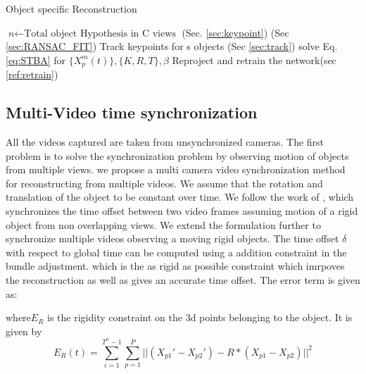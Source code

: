 \documentclass[10pt,twocolumn,letterpaper]{article}
\begin{document}
\begin{algorithm}
\caption{Object specific Reconstruction}\label{euclid}
%
$\textit{n} \gets \text{Total object Hypothesis in C views }$(Sec. \ref{sec:keypoint})\;
(Sec \ref{sec:RANSAC_FIT})
Track keypoints for s objects (Sec \ref{sec:track})\;
solve Eq.\ref{eq:STBA} for $\lbrace X_p^m(t) \rbrace,\lbrace K,R,T \rbrace,\beta$\;
Reproject and retrain the network(sec \ref{ref:retrain})\;
\end{algorithm}



\subsection{Multi-Video time synchronization}
All the videos captured are taken from unsynchronized cameras. The first problem is to solve the synchronization problem by observing motion of objects from multiple views. we propose a multi camera video synchronization method for reconstructing from multiple videos. We assume that the rotation and translation of the object to be constant over time. We follow the work of \cite{gaspar2014synchronization}, which synchronizes the time offset between two video frames assuming motion of a rigid object from non overlapping views. We extend the formulation further to synchronize multiple videos observing a moving rigid objects. The time offset $\delta$ with respect to global time can be computed using a addition constraint in the bundle adjustment. which is the as rigid as possible constraint which imrpoves the reconstruction as well as gives an accurate time offset. The error term is given as:
  

where$E_R$ is the rigidity constraint on the 3d points belonging to the object. It is given by
\begin{equation}
E_R(t) =  \sum_{i = 1}^{T^n -1}\sum_{p = 1}^P||(X_{p1}'-X_{p2}')-R*(X_{p1}-X_{p2})||^2 
\end{equation}
\end{document}

